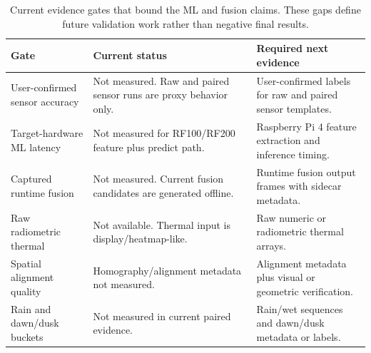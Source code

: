 \begin{table}[!htbp]
\centering
\small
\caption{Current evidence gates that bound the ML and fusion claims. These gaps define future validation work rather than negative final results.}
\label{tab:ch7-evidence-gates}
\begin{tabularx}{\textwidth}{@{}lXX@{}}
\hline
\textbf{Gate} & \textbf{Current status} & \textbf{Required next evidence} \\
\hline
User-confirmed sensor accuracy & Not measured. Raw and paired sensor runs are proxy behavior only. & User-confirmed labels for raw and paired sensor templates. \\
Target-hardware ML latency & Not measured for RF100/RF200 feature plus predict path. & Raspberry Pi 4 feature extraction and inference timing. \\
Captured runtime fusion & Not measured. Current fusion candidates are generated offline. & Runtime fusion output frames with sidecar metadata. \\
Raw radiometric thermal & Not available. Thermal input is display/heatmap-like. & Raw numeric or radiometric thermal arrays. \\
Spatial alignment quality & Homography/alignment metadata not measured. & Alignment metadata plus visual or geometric verification. \\
Rain and dawn/dusk buckets & Not measured in current paired evidence. & Rain/wet sequences and dawn/dusk metadata or labels. \\
\hline
\end{tabularx}
\end{table}
